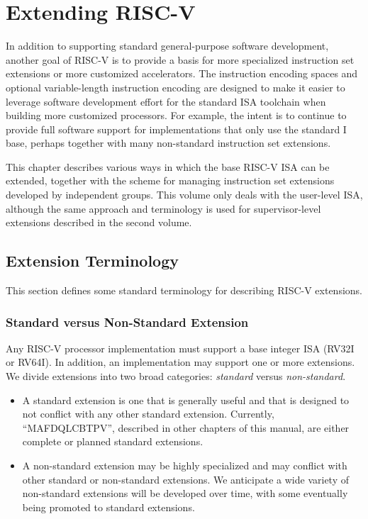 \chapter{Extending RISC-V}
\label{extensions}

In addition to supporting standard general-purpose software
development, another goal of RISC-V is to provide a basis for more
specialized instruction set extensions or more customized
accelerators.  The instruction encoding spaces and optional
variable-length instruction encoding are designed to make it easier to
leverage software development effort for the standard ISA toolchain
when building more customized processors.  For example, the intent is
to continue to provide full software support for implementations that
only use the standard I base, perhaps together with many non-standard
instruction set extensions.

This chapter describes various ways in which the base RISC-V ISA can
be extended, together with the scheme for managing instruction set
extensions developed by independent groups.  This volume only deals
with the user-level ISA, although the same approach and terminology is
used for supervisor-level extensions described in the second volume.

\section{Extension Terminology}

This section defines some standard terminology for describing RISC-V
extensions.
\vspace{-0.2in}
\subsection*{Standard versus Non-Standard Extension}

Any RISC-V processor implementation must support a base integer ISA
(RV32I or RV64I).  In addition, an implementation may support one or
more extensions.  We divide extensions into two broad categories: {\em
  standard} versus {\em non-standard}.
\begin{itemize}
\item A standard extension is one that is generally useful and that is
  designed to not conflict with any other standard extension.
  Currently, ``MAFDQLCBTPV'', described in other chapters of this
  manual, are either complete or planned standard extensions.
\item A non-standard extension may be highly specialized and may
  conflict with other standard or non-standard extensions.  We
  anticipate a wide variety of non-standard extensions will be
  developed over time, with some eventually being promoted to standard
  extensions.
\end{itemize}

